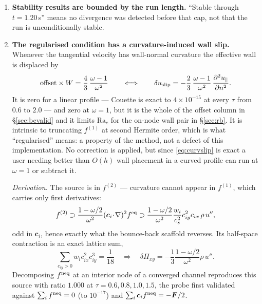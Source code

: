 \documentclass[11pt,a4paper]{article}
\newcommand{\cs}{c_s}
\newcommand{\ci}{\bm{c}_i}
\newcommand{\e}[1]{\times 10^{#1}}
\begin{document}
\begin{enumerate}[leftmargin=1.4em,itemsep=4pt]
\item \textbf{Stability results are bounded by the run length.} ``Stable through
  $t=1.20$\,s'' means no divergence was detected before that cap, not that the run
  is unconditionally stable.

\item \textbf{The regularised condition has a curvature-induced wall slip.}
  Whenever the tangential velocity has wall-normal curvature the effective wall
  is displaced by
  \begin{equation}
    \text{offset}\times W = \frac{4}{3}\,\frac{\omega-1}{\omega^{2}}
    \qquad\Longleftrightarrow\qquad
    \delta u_{\rm slip} = -\frac23\,\frac{\omega-1}{\omega^2}
                          \,\frac{\partial^2u_\parallel}{\partial n^2}.
    \label{eq:curvslip2}
  \end{equation}
  It is zero for a linear profile --- Couette is exact to $4\e{-15}$ at every
  $\tau$ from $0.6$ to $2.0$ --- and zero at $\omega=1$, but it is the whole of
  the offset column in \S\ref{sec:bcvalid} and it limits $\mathrm{Ra}_c$ for the
  on-node wall pair in \S\ref{sec:rb}. It is intrinsic to truncating $f^{(1)}$ at
  second Hermite order, which is what ``regularised'' means: a property of the
  method, not a defect of this implementation. No correction is applied, but
  since \eqref{eq:curvslip} is exact a user needing better than $O(h)$ wall
  placement in a curved profile can run at $\omega=1$ or subtract it.

  \emph{Derivation.} The source is in $f^{(2)}$ --- curvature cannot appear in
  $f^{(1)}$, which carries only first derivatives:
  \begin{equation}
    f^{(2)} \supset \frac{1-\omega/2}{\omega^{2}}(\ci\!\cdot\!\nabla)^2 f^{\rm eq}
            \supset \frac{1-\omega/2}{\omega^{2}}\frac{w_i}{\cs^2}
                    c_{iy}^{2}c_{ix}\,\rho\,u'' ,
  \end{equation}
  odd in $\ci$, hence exactly what the bounce-back scaffold reverses. Its
  half-space contraction is an exact lattice sum,
  \begin{equation}
    \sum_{c_{iy}>0} w_i c_{ix}^{2}c_{iy}^{3} = \frac{1}{18}
    \quad\Longrightarrow\quad
    \delta\Pi_{xy} = -\frac13\frac{1-\omega/2}{\omega^{2}}\rho\,u'' .
  \end{equation}
  Decomposing $f^{\rm neq}$ at an interior node of a converged channel
  reproduces this source with ratio $1.000$ at $\tau=0.6,0.8,1.0,1.5$, the probe
  first validated against $\sum_i f^{\rm neq}=0$ (to $10^{-17}$) and
  $\sum_i\ci f^{\rm neq}=-\bm F/2$.


\end{enumerate}
\end{document}
